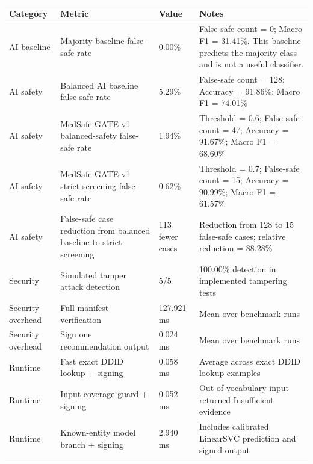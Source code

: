 \begin{tabular}{llll}
\toprule
Category & Metric & Value & Notes \\
\midrule
AI baseline & Majority baseline false-safe rate & 0.00\% & False-safe count = 0; Macro F1 = 31.41\%. This baseline predicts the majority class and is not a useful classifier. \\
AI safety & Balanced AI baseline false-safe rate & 5.29\% & False-safe count = 128; Accuracy = 91.86\%; Macro F1 = 74.01\% \\
AI safety & MedSafe-GATE v1 balanced-safety false-safe rate & 1.94\% & Threshold = 0.6; False-safe count = 47; Accuracy = 91.67\%; Macro F1 = 68.60\% \\
AI safety & MedSafe-GATE v1 strict-screening false-safe rate & 0.62\% & Threshold = 0.7; False-safe count = 15; Accuracy = 90.99\%; Macro F1 = 61.57\% \\
AI safety & False-safe case reduction from balanced baseline to strict-screening & 113 fewer cases & Reduction from 128 to 15 false-safe cases; relative reduction = 88.28\% \\
Security & Simulated tamper attack detection & 5/5 & 100.00\% detection in implemented tampering tests \\
Security overhead & Full manifest verification & 127.921 ms & Mean over benchmark runs \\
Security overhead & Sign one recommendation output & 0.024 ms & Mean over benchmark runs \\
Runtime & Fast exact DDID lookup + signing & 0.058 ms & Average across exact DDID lookup examples \\
Runtime & Input coverage guard + signing & 0.052 ms & Out-of-vocabulary input returned Insufficient evidence \\
Runtime & Known-entity model branch + signing & 2.940 ms & Includes calibrated LinearSVC prediction and signed output \\
\bottomrule
\end{tabular}
